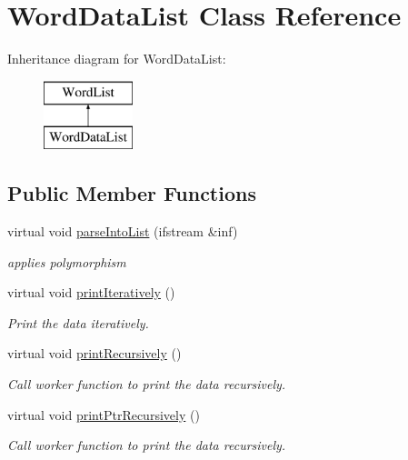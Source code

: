 \hypertarget{classWordDataList}{\section{Word\-Data\-List Class Reference}
\label{classWordDataList}
}
Inheritance diagram for Word\-Data\-List\-:\begin{figure}[H]
\begin{center}
\leavevmode
\includegraphics[height=2.000000cm]{classWordDataList}
\end{center}
\end{figure}
\subsection*{Public Member Functions}
\begin{DoxyCompactItemize}
\item 
virtual void \hyperlink{classWordDataList_a5408e39b6c4c58e0d21463560ee60cd0}{parse\-Into\-List} (ifstream \&inf)
\begin{DoxyCompactList}\small\item\em applies polymorphism \end{DoxyCompactList}\item 
\hypertarget{classWordDataList_aec2c3363ab94af00c6bce272c04358d2}{virtual void \hyperlink{classWordDataList_aec2c3363ab94af00c6bce272c04358d2}{print\-Iteratively} ()}\label{classWordDataList_aec2c3363ab94af00c6bce272c04358d2}

\begin{DoxyCompactList}\small\item\em Print the data iteratively. \end{DoxyCompactList}\item 
\hypertarget{classWordDataList_a40afa65c3afcd1f96e887de858914b83}{virtual void \hyperlink{classWordDataList_a40afa65c3afcd1f96e887de858914b83}{print\-Recursively} ()}\label{classWordDataList_a40afa65c3afcd1f96e887de858914b83}

\begin{DoxyCompactList}\small\item\em Call worker function to print the data recursively. \end{DoxyCompactList}\item 
\hypertarget{classWordDataList_a9406a5f004ebe03d09851fbe8b2b827d}{virtual void \hyperlink{classWordDataList_a9406a5f004ebe03d09851fbe8b2b827d}{print\-Ptr\-Recursively} ()}\label{classWordDataList_a9406a5f004ebe03d09851fbe8b2b827d}

\begin{DoxyCompactList}\small\item\em Call worker function to print the data recursively. \end{DoxyCompactList}\end{DoxyCompactItemize}


